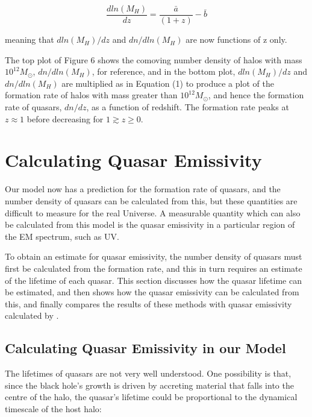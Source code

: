 \documentclass[12pt]{article}%
\begin{document}
\begin{equation}
    \frac{dln(M_H)}{dz}=\frac{\bar a}{(1+z)}-\bar b
\end{equation}

\noindent meaning that $dln(M_H)/dz$ and $dn/dln(M_H)$ are now functions of z only.\par

The top plot of Figure 6 shows the comoving number density of halos with mass $10^{12}M_\odot$, $dn/dln(M_H)$, for reference, and in the bottom plot, $dln(M_H)/dz$ and $dn/dln(M_H)$ are multiplied as in Equation (1) to produce a plot of the formation rate of halos with mass greater than $10^{12}M_\odot$, and hence the formation rate of quasars, $dn/dz$, as a function of redshift. The formation rate peaks at $z\approx1$ before decreasing for $1 \gtrsim z \geq 0$.

\section{Calculating Quasar Emissivity}

Our model now has a prediction for the formation rate of quasars, and the number density of quasars can be calculated from this, but these quantities are difficult to measure for the real Universe. A measurable quantity which can also be calculated from this model is the quasar emissivity in a particular region of the EM spectrum, such as UV.\par

To obtain an estimate for quasar emissivity, the number density of quasars must first be calculated from the formation rate, and this in turn requires an estimate of the lifetime of each quasar. This section discusses how the quasar lifetime can be estimated, and then shows how the quasar emissivity can be calculated from this, and finally compares the results of these methods with quasar emissivity calculated by \cite{Haardt_Madau}.

\subsection{Calculating Quasar Emissivity in our Model}

The lifetimes of quasars are not very well understood. One possibility is that, since the black hole’s growth is driven by accreting material that falls into the centre of the halo, the quasar’s lifetime could be proportional to the dynamical timescale of the host halo:
\end{document}
